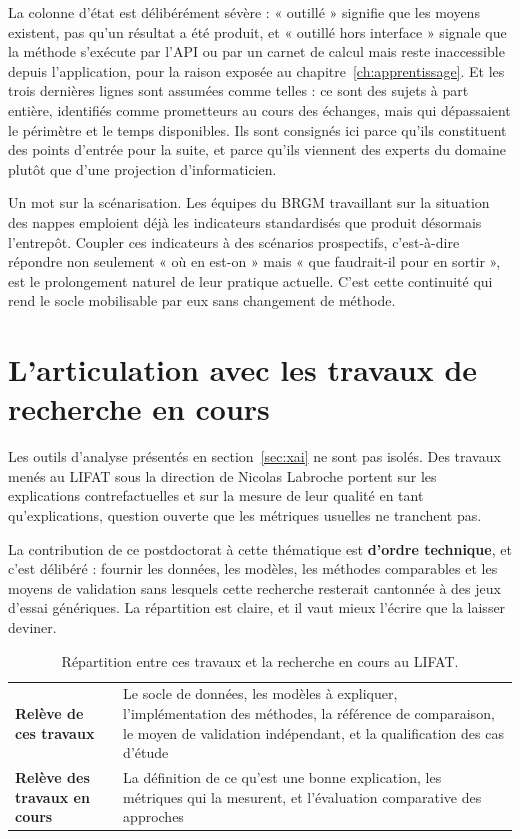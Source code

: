 La colonne d'état est délibérément sévère : « outillé » signifie
que les moyens existent, pas qu'un résultat a été produit, et « outillé hors interface » signale
que la méthode s'exécute par l'API ou par un carnet de calcul mais reste inaccessible depuis
l'application, pour la raison exposée au chapitre~\ref{ch:apprentissage}. Et les trois dernières lignes sont
assumées comme telles : ce sont des sujets à part entière, identifiés comme prometteurs au cours
des échanges, mais qui dépassaient le périmètre et le temps disponibles. Ils sont consignés ici
parce qu'ils constituent des points d'entrée pour la suite, et parce qu'ils viennent des experts
du domaine plutôt que d'une projection d'informaticien.

Un mot sur la scénarisation. Les équipes du BRGM travaillant
sur la situation des nappes emploient déjà les indicateurs standardisés que produit désormais
l'entrepôt. Coupler ces indicateurs à des scénarios prospectifs, c'est-à-dire répondre non
seulement « où en est-on » mais « que faudrait-il pour en sortir », est le prolongement naturel
de leur pratique actuelle. C'est cette continuité qui rend le socle mobilisable par eux sans
changement de méthode.

\section{L'articulation avec les travaux de recherche en cours}

Les outils d'analyse présentés en section~\ref{sec:xai} ne sont pas isolés. Des travaux menés au
LIFAT sous la direction de Nicolas Labroche portent sur les explications contrefactuelles et sur
la mesure de leur qualité en tant qu'explications, question ouverte que les métriques usuelles ne
tranchent pas.

La contribution de ce postdoctorat à cette thématique est \textbf{d'ordre technique}, et c'est
délibéré : fournir les données, les modèles, les méthodes comparables et les moyens de
validation sans lesquels cette recherche resterait cantonnée à des jeux d'essai génériques. La
répartition est claire, et il vaut mieux l'écrire que la laisser deviner.

\begin{table}[H]
\centering
\caption{Répartition entre ces travaux et la recherche en cours au LIFAT.}
\label{tab:repartition}
\begin{tabularx}{\textwidth}{@{}lX@{}}
\toprule
\textbf{Relève de ces travaux} & Le socle de données, les modèles à expliquer, l'implémentation
des méthodes, la référence de comparaison, le moyen de validation indépendant, et la
qualification des cas d'étude \\
\textbf{Relève des travaux en cours} & La définition de ce qu'est une bonne explication, les
métriques qui la mesurent, et l'évaluation comparative des approches \\
\bottomrule
\end{tabularx}
\end{table}

